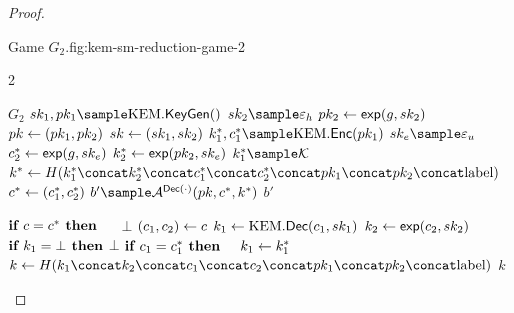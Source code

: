 \begin{proof}
\begin{itemize}
        \begin{gamefigure}{Game $G_2$.}{fig:kem-sm-reduction-game-2}
            \begin{games}{2}
                \begin{gameenv}{\game $G_2$}
                    \State $\sk_1, \pk_1 \sample \kem.\keygen()$
                    \State $\sk_2 \sample \honestexponent$
                    \State $pk_2 \leftarrow \textsf{exp}(g, sk_2)$
                    \State $pk \leftarrow (pk_1, pk_2)$
                    \State $sk \leftarrow (sk_1, sk_2)$
                    \State $k^*_1, c^*_1 \sample \kem.\enc(\pk_1)$
                    \State $\sk_e \sample \exponent$
                    \State $c^*_2 \leftarrow \textsf{exp}(g, sk_e)$
                    \State $k^*_2 \leftarrow \textsf{exp}(pk_2, sk_e)$
                    \State $k_1^* \sample \mathcal{K}$
                    \State $k^* \assign H(\hashinputchallenges)$
                    \State  {}
                    \State $c^* \leftarrow (c_1^*, c_2^*)$
                    \State $b' \sample \adversary{A}^{\dec(\cdot)}(\pk, c^*, k^*)$
                    \State \Return $b'$
                \end{gameenv}

                \gamebreak

                \begin{gameenv}{\oracledec}
                    \State $\textbf{if } c = c^* \textbf{ then}$
                    \State $\quad$ \Return $\bot$
                    \State $(c_1, c_2) \leftarrow c$
                    \State $k_1 \leftarrow \text{KEM}.\textsf{Dec}(c_1, sk_1)$
                    \State $k_2 \leftarrow \textsf{exp}(c_2, sk_2)$
                    \State $\textbf{if } k_1 = \bot \textbf{ then}$
                    \State \quad \Return $\bot$
                    \State $\textbf{if } c_1 = c^*_1 \textbf{ then}$
                    \State $\quad k_1 \leftarrow k_1^*$
                    \State $k \assign H(\hashinput)$
                    \State {}
                    \State {}
                    \State \Return $k$
                \end{gameenv}
            \end{games}
        \end{gamefigure}


\end{itemize}
\end{proof}
